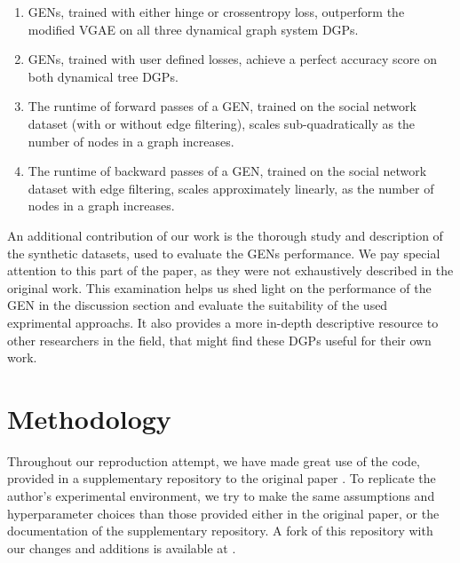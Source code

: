 \begin{enumerate}[label=\textbf{Claim} (\roman*):,leftmargin=*,align=left]
    \item GENs, trained with either hinge or crossentropy loss, outperform the modified VGAE on all three dynamical graph system DGPs.
    
    \item GENs, trained with user defined losses, achieve a perfect accuracy score on both dynamical tree DGPs.
    
    \item The runtime of forward passes of a GEN, trained on the social network dataset (with or without edge filtering), scales sub-quadratically as the number of nodes in a graph increases.
    \item The runtime of backward passes of a GEN, trained on the social network dataset  with edge filtering, scales approximately linearly, as the number of nodes in a graph increases.
\end{enumerate}

An additional contribution of our work is the thorough study and description of the synthetic datasets, used to evaluate the GENs performance. We pay special attention to this part of the paper, as they were not exhaustively described in the original work. This examination helps us shed light on the performance of the GEN in the discussion section and evaluate the suitability of the used exprimental approachs. It also provides a more in-depth descriptive resource to other researchers in the field, that might find these DGPs useful for their own work.


\section{Methodology}

Throughout our reproduction attempt, we have made great use of the code, provided in a supplementary repository to the original paper \cite{gitlab}. To replicate the author's experimental environment, we try to make the same assumptions and hyperparameter choices than those provided either in the original paper, or the documentation of the supplementary repository. A fork of this repository with our changes and additions is available at \cite{Git}.

